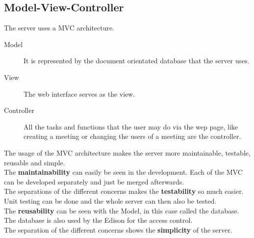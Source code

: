 \subsection{Model-View-Controller}
The server uses a MVC architecture.
\begin{description}
\item[Model] It is represented by the document orientated database that the server uses.
\item[View] The web interface serves as the view.
\item[Controller] All the tasks and functions that the user may do via the wep page, like creating a meeting or changing the users of a meeting are the controller.
\end{description}
The usage of the MVC architecture makes the server more maintainable, testable, reusable and simple.\\ 
 The \textbf{maintainability} can easily be seen in the development. Each of the MVC can be developed separately and just be merged afterwards.\\
The separations of the different concerns makes the \textbf{testability} so much easier. Unit testing can be done and the whole server can then also be tested.\\
The \textbf{reusability} can be seen with the Model, in this case called the database. The database is also used by the Edison for the access control.\\
 The separation of the different concerns shows the \textbf{simplicity} of the server. 


